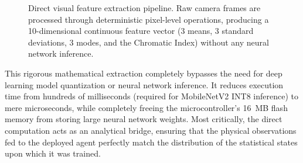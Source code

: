     \begin{figure}[ht]
        \centering
        \caption{Direct visual feature extraction pipeline. Raw camera frames are processed through deterministic pixel-level operations, producing a 10-dimensional continuous feature vector (3 means, 3 standard deviations, 3 modes, and the Chromatic Index) without any neural network inference.}
        \label{fig:feature_pipeline}
    \end{figure}

    This rigorous mathematical extraction completely bypasses the need for deep learning model quantization or neural network inference. It reduces execution time from hundreds of milliseconds (required for MobileNetV2 INT8 inference) to mere microseconds, while completely freeing the microcontroller's 16~MB flash memory from storing large neural network weights. Most critically, the direct computation acts as an analytical bridge, ensuring that the physical observations fed to the deployed agent perfectly match the distribution of the statistical states upon which it was trained.

